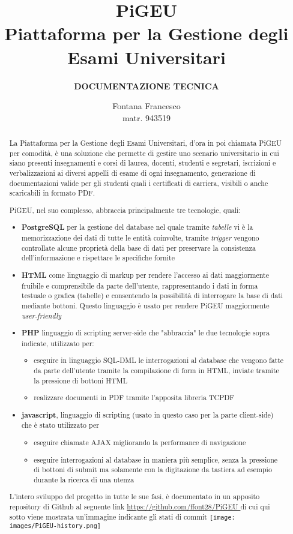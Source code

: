 \documentclass{article}
\title{PiGEU\\ Piattaforma per la Gestione degli Esami Universitari}
\author{\textbf{DOCUMENTAZIONE TECNICA}}
\date{Fontana Francesco \\ matr. 943519}
\begin{document}
\maketitle
\begin{abstract}

La Piattaforma per la Gestione degli Esami Universitari, d'ora in poi chiamata PiGEU per comodità, è una soluzione che permette di gestire
uno scenario universitario in cui siano presenti insegnamenti e corsi di laurea, docenti, studenti e segretari, iscrizioni e verbalizzazioni
ai diversi appelli di esame di ogni insegnamento, generazione di documentazioni valide per gli studenti quali i certificati di carriera, visibili
o anche scaricabili in formato PDF.

PiGEU, nel suo complesso, abbraccia principalmente tre tecnologie, quali:
\begin{itemize}
    \item \textbf{PostgreSQL} per la gestione del database nel quale tramite \emph{tabelle} vi è la memorizzazione dei dati di tutte
le entità coinvolte, tramite \emph{trigger} vengono controllate alcune proprietà della base di dati per preservare la consistenza dell'informazione e rispettare le specifiche fornite
    \item \textbf{HTML} come linguaggio di markup per rendere l'accesso ai dati maggiormente fruibile e comprensibile da parte dell'utente, rappresentando i dati in forma testuale o grafica (tabelle) e consentendo la possibilità di interrogare la base di dati mediante bottoni. Questo linguaggio è usato per rendere PiGEU maggiormente \emph{user-friendly}
    \item \textbf{PHP} linguaggio di scripting server-side che "abbraccia" le due tecnologie sopra indicate, utilizzato per:
    \begin{itemize}
        \item eseguire in linguaggio SQL-DML le interrogazioni al database che vengono fatte da parte dell'utente tramite la compilazione di form in HTML, inviate tramite la pressione di bottoni HTML
        \item realizzare documenti in PDF tramite l'apposita libreria TCPDF
    \end{itemize}
    \item \textbf{javascript}, linguaggio di scripting (usato in questo caso per la parte client-side) che è stato utilizzato per
    \begin{itemize}
        \item eseguire chiamate AJAX migliorando la performance di navigazione
        \item eseguire interrogazioni al database in maniera più semplice, senza la pressione di bottoni di submit ma solamente con la digitazione da tastiera ad esempio durante la ricerca di una utenza
    \end{itemize}
\end{itemize}
L'intero sviluppo del progetto in tutte le sue fasi, è documentato in un apposito repository di Github al seguente link \url{https://github.com/ffont28/PiGEU } di cui qui sotto viene mostrata un'immagine indicante gli stati di commit
\texttt{[image: images/PiGEU-history.png]}
\end{abstract}
\end{document}
